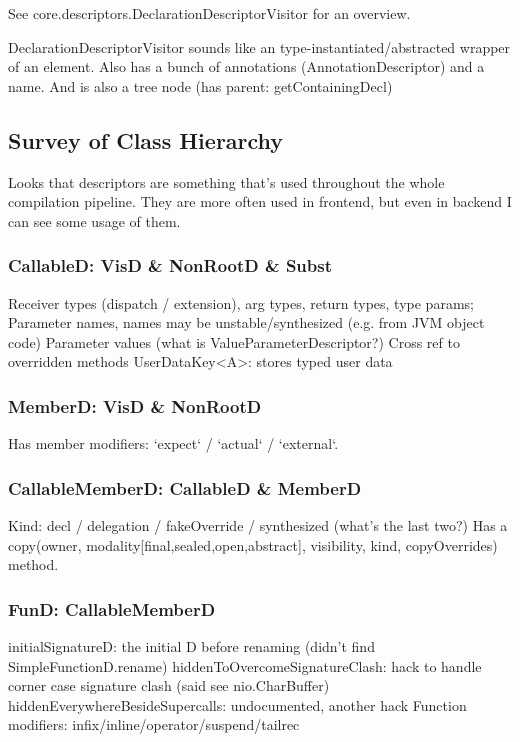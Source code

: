 \documentclass{article}
\begin{document}
See core.descriptors.DeclarationDescriptorVisitor for an overview.

DeclarationDescriptorVisitor sounds like an type-instantiated/abstracted wrapper of an element. Also has a bunch of annotations (AnnotationDescriptor) and a name. And is also a tree node (has parent: getContainingDecl)

\subsection{Survey of Class Hierarchy}

Looks that descriptors are something that's used throughout the whole compilation pipeline. They are more often used in frontend, but even in backend I can see some usage of them.

\subsubsection{CallableD: VisD \& NonRootD \& Subst}

Receiver types (dispatch / extension), arg types, return types, type params;
Parameter names, names may be unstable/synthesized (e.g. from JVM object code)
Parameter values (what is ValueParameterDescriptor?)
Cross ref to overridden methods
UserDataKey<A>: stores typed user data

\subsubsection{MemberD: VisD \& NonRootD}

Has member modifiers: `expect` / `actual` / `external`.

\subsubsection{CallableMemberD: CallableD \& MemberD}

Kind: decl / delegation / fakeOverride / synthesized (what's the last two?)
Has a copy(owner, modality[final,sealed,open,abstract], visibility, kind, copyOverrides) method.

\subsubsection{FunD: CallableMemberD}

initialSignatureD: the initial D before renaming (didn't find SimpleFunctionD.rename)
hiddenToOvercomeSignatureClash: hack to handle corner case signature clash (said see nio.CharBuffer)
hiddenEverywhereBesideSupercalls: undocumented, another hack
Function modifiers: infix/inline/operator/suspend/tailrec
\end{document}
